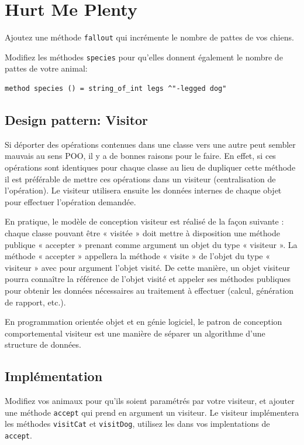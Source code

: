 \documentclass[a4paper]{article}
\begin{document}
\section{Hurt Me Plenty}

Ajoutez une méthode \verb|fallout| qui incrémente le nombre de pattes de vos
chiens.

Modifiez les méthodes \verb|species| pour qu'elles donnent également le
nombre de pattes de votre animal:

\begin{verbatim}
method species () = string_of_int legs ^"-legged dog"
\end{verbatim}


\subsection{Design pattern: Visitor}

Si déporter des opérations contenues dans une classe vers une autre peut
sembler mauvais au sens POO, il y a de bonnes raisons pour le faire. En effet,
si ces opérations sont identiques pour chaque classe au lieu de dupliquer cette
méthode il est préférable de mettre ces opérations dans un visiteur
(centralisation de l'opération). Le visiteur utilisera ensuite les données
internes de chaque objet pour effectuer l'opération demandée.

En pratique, le modèle de conception visiteur est réalisé de la façon suivante
: chaque classe pouvant être « visitée » doit mettre à disposition une méthode
publique « accepter » prenant comme argument un objet du type « visiteur ». La
méthode « accepter » appellera la méthode « visite » de l'objet du type «
visiteur » avec pour argument l'objet visité. De cette manière, un objet
visiteur pourra connaître la référence de l'objet visité et appeler ses
méthodes publiques pour obtenir les données nécessaires au traitement à
effectuer (calcul, génération de rapport, etc.).

En programmation orientée objet et en génie logiciel, le patron de conception
comportemental visiteur est une manière de séparer un algorithme d'une
structure de données.

\subsection{Implémentation}

Modifiez vos animaux pour qu'ils soient paramétrés par votre visiteur, et
ajouter une méthode \verb|accept| qui prend en argument un visiteur. Le
visiteur implémentera les méthodes \verb|visitCat| et \verb|visitDog|, utilisez
les dans vos implentations de \verb|accept|.
\end{document}

